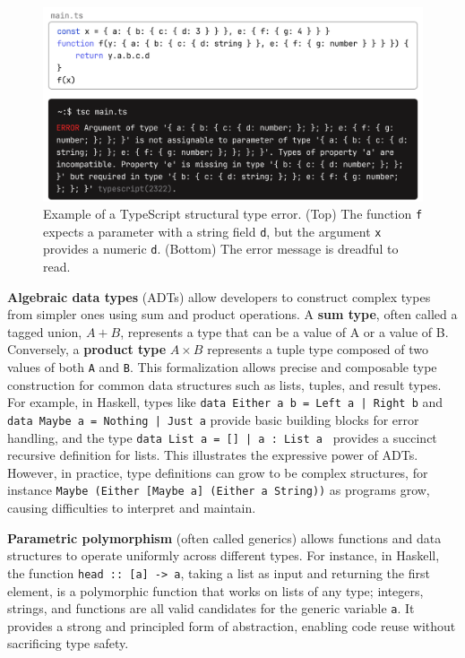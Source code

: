 \documentclass[preprint,12pt]{elsarticle}
\begin{document}
\begin{figure}[]
  \includegraphics[width=\linewidth]{figures/structural}
  \caption{\label{fig:structural} Example of a TypeScript structural type error. (Top) The function \texttt{f} expects a parameter with a string field \texttt{d}, but the argument {\tt x} provides a numeric {\tt d}. (Bottom) The error message is dreadful to read.}
\end{figure}

{\bf Algebraic data types} (ADTs) \cite{Milner1978-qz} allow developers to construct complex types from simpler ones using sum and product operations. A {\bf sum type}, often called a tagged union, $A + B$, represents a type that can be a value of A or a value of B. Conversely, a {\bf product type} $A \times B$ represents a tuple type composed of two values of both {\tt A} and {\tt B}. This formalization allows precise and composable type construction for common data structures such as lists, tuples, and result types.
For example, in Haskell, types like \texttt{data Either a b = Left a | Right b} and \texttt{data Maybe a = Nothing | Just a} provide basic building blocks for error handling, and the type \texttt{data List a = [] | a : List a } provides a succinct recursive definition for lists. This illustrates the expressive power of ADTs. However, in practice, type definitions can grow to be complex structures, for instance \texttt {Maybe (Either [Maybe a] (Either a String))} as programs grow, causing difficulties to interpret and maintain. 


{\bf Parametric polymorphism} (often called generics) allows functions and data structures to operate uniformly across different types. For instance, in Haskell, the function \texttt{head :: [a] -> a}, taking a list as input and returning the first element, is a polymorphic function that works on lists of any type; integers, strings, and functions are all valid candidates for the generic variable \texttt{a}.  It provides a strong and principled form of abstraction, enabling code reuse without sacrificing type safety.
\end{document}
